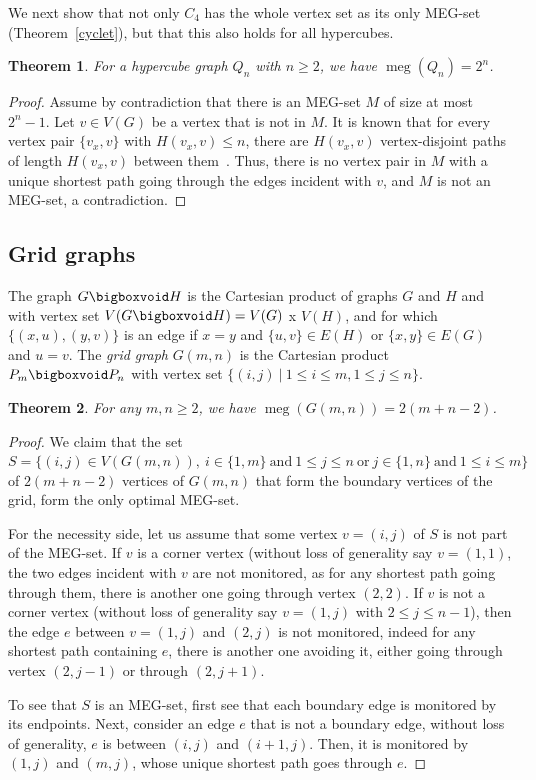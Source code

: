 \documentclass[10pt,a4paper]{article}
\newtheorem{theorem}{Theorem}[section]
\DeclareMathOperator{\MEG}{meg}
\begin{document}
We next show that not only $C_4$ has the whole vertex set as its only MEG-set (Theorem~\ref{cyclet}), but that this also holds for all hypercubes.

\begin{theorem}\label{hyperc}
For a hypercube graph $Q_n$ with $n \geq 2$, we have $\MEG(Q_n) = 2^n$.
\end{theorem}
\begin{proof}
Assume by contradiction that there is an MEG-set $M$ of size at most $2^n - 1$. Let $v \in V(G)$ be a vertex that is not in $M$. It is known that for every vertex pair $\{v_x, v\}$ with $H(v_x , v)\leq n$, there are $H(v_x , v)$ vertex-disjoint paths of length $H(v_x , v)$ between them~\cite{r8}. Thus, there is no vertex pair in $M$ with a unique shortest path going through the edges incident with $v$, and $M$ is not an MEG-set, a contradiction.
\end{proof}




\subsection{Grid graphs}

The graph $G \bigboxvoid H$ is the Cartesian product of graphs $G$ and $H$ and with vertex set $V(G \bigboxvoid H) = V(G)$ x $V(H)$, and for which $\{(x,u),(y,v)\}$ is an edge if $x = y$ and
$\{u,v\}\in E(H)$ or $\{x,y\}\in E(G)$ and $u = v$. The \emph{grid graph} $G(m,n)$ is the Cartesian product $P_m \bigboxvoid P_n$ with vertex set $\{(i,j)~|~1\leq i\leq m, 1\leq j\leq n\}$.

\begin{theorem}
For any $m,n\geq 2$, we have $\MEG(G(m,n)) = 2(m+n-2)$.
\end{theorem}
\begin{proof}
We claim that the set $S=\{(i,j)\in V(G(m,n)), ~i\in\{1,m\}~\text{and}~1\leq j\leq n~\text{or}~j\in\{1,n\}~\text{and}~1\leq i\leq m\}$ of $2(m+n-2)$ vertices of $G(m,n)$ that form the boundary vertices of the grid, form the only optimal MEG-set.

For the necessity side, let us assume that some vertex $v=(i,j)$ of $S$ is not part of the MEG-set. If $v$ is a corner vertex (without loss of generality say $v=(1,1)$, the two edges incident with $v$ are not monitored, as for any shortest path going through them, there is another one going through vertex $(2,2)$. If $v$ is not a corner vertex (without loss of generality say $v=(1,j)$ with $2\leq j\leq n-1$), then the edge $e$ between $v=(1,j)$ and $(2,j)$ is not monitored, indeed for any shortest path containing $e$, there is another one avoiding it, either going through vertex $(2,j-1)$ or through $(2,j+1)$.


To see that $S$ is an MEG-set, first see that each boundary edge is monitored by its endpoints. Next, consider an edge $e$ that is not a boundary edge, without loss of generality, $e$ is between $(i,j)$ and $(i+1,j)$. Then, it is monitored by $(1,j)$ and $(m,j)$, whose unique shortest path goes through $e$.  
\end{proof}
\end{document}
